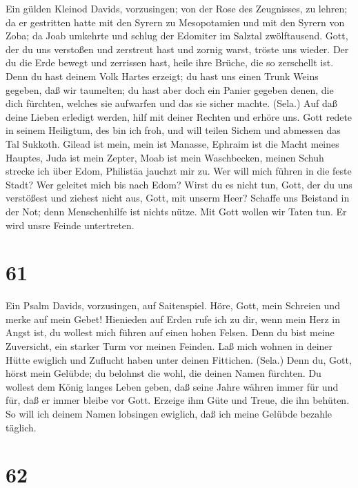  Ein gülden Kleinod Davids, vorzusingen; von der Rose des
Zeugnisses, zu lehren; da er gestritten hatte mit den Syrern zu
Mesopotamien und mit den Syrern von Zoba; da Joab umkehrte und schlug
der Edomiter im Salztal zwölftausend. Gott, der du uns verstoßen und
zerstreut hast und zornig warst, tröste uns wieder.  Der du
die Erde bewegt und zerrissen hast, heile ihre Brüche, die so zerschellt
ist.  Denn du hast deinem Volk Hartes erzeigt; du hast uns
einen Trunk Weins gegeben, daß wir taumelten;  du hast aber
doch ein Panier gegeben denen, die dich fürchten, welches sie aufwarfen
und das sie sicher machte. (Sela.)  Auf daß deine Lieben
erledigt werden, hilf mit deiner Rechten und erhöre uns. 
Gott redete in seinem Heiligtum, des bin ich froh, und will teilen
Sichem und abmessen das Tal Sukkoth.  Gilead ist mein, mein
ist Manasse, Ephraim ist die Macht meines Hauptes, Juda ist mein Zepter,
 Moab ist mein Waschbecken, meinen Schuh strecke ich über
Edom, Philistäa jauchzt mir zu.  Wer will mich führen in die
feste Stadt? Wer geleitet mich bis nach Edom?  Wirst du es
nicht tun, Gott, der du uns verstößest und ziehest nicht aus, Gott, mit
unserm Heer?  Schaffe uns Beistand in der Not; denn
Menschenhilfe ist nichts nütze.  Mit Gott wollen wir Taten
tun. Er wird unsre Feinde untertreten.

\hypertarget{section-60}{%
\section{61}\label{section-60}}

 Ein Psalm Davids, vorzusingen, auf Saitenspiel. Höre, Gott,
mein Schreien und merke auf mein Gebet!  Hienieden auf Erden
rufe ich zu dir, wenn mein Herz in Angst ist, du wollest mich führen auf
einen hohen Felsen.  Denn du bist meine Zuversicht, ein
starker Turm vor meinen Feinden.  Laß mich wohnen in deiner
Hütte ewiglich und Zuflucht haben unter deinen Fittichen. (Sela.)
 Denn du, Gott, hörst mein Gelübde; du belohnst die wohl,
die deinen Namen fürchten.  Du wollest dem König langes
Leben geben, daß seine Jahre währen immer für und für,  daß
er immer bleibe vor Gott. Erzeige ihm Güte und Treue, die ihn behüten.
 So will ich deinem Namen lobsingen ewiglich, daß ich meine
Gelübde bezahle täglich.

\hypertarget{section-61}{%
\section{62}\label{section-61}}


